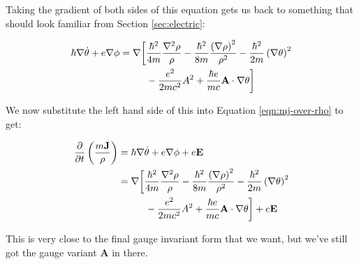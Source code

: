 Taking the gradient of both sides of this equation gets us back to something
that should look familiar from Section \ref{sec:electric}:

\begin{align}
    \hbar \nabla \dot \theta + e \nabla \phi
    = \nabla \bigg[&
      \frac{\hbar^2}{4m} \frac{\nabla^2 \rho}{\rho}
    - \frac{\hbar^2}{8m} \frac{ \left( \nabla \rho \right)^2}{\rho^2}
    - \frac{\hbar^2}{2m} \left( \nabla \theta \right)^2
    \notag \\ &
    - \frac{e^2}{2mc^2} A^2
    + \frac{\hbar e}{mc} \mathbf{A} \cdot \nabla \theta \bigg]
\end{align}

We now substitute the left hand side of this into Equation \ref{eqn:mj-over-rho}
to get:

\begin{align}
    \frac{\partial}{\partial t} \left( \frac{m \mathbf{J}}{\rho} \right)
    &=  \hbar \nabla \dot \theta + e \nabla \phi + e \mathbf{E} \\
    &=  \nabla \bigg[
      \frac{\hbar^2}{4m} \frac{\nabla^2 \rho}{\rho}
    - \frac{\hbar^2}{8m} \frac{ \left( \nabla \rho \right)^2}{\rho^2}
    - \frac{\hbar^2}{2m} \left( \nabla \theta \right)^2
    \notag \\ & \hspace{28pt}
    - \frac{e^2}{2mc^2} A^2
    + \frac{\hbar e}{mc} \mathbf{A} \cdot \nabla \theta \bigg]
    + e \mathbf{E}
    \label{eqn:end-of-sec-4}
\end{align}

This is very close to the final gauge invariant form that we want, but we've
still got the gauge variant $\mathbf{A}$ in there.
